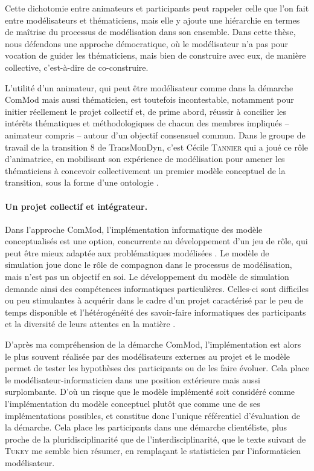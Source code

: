Cette dichotomie entre \og animateurs\fg{} et \og participants\fg{} peut rappeler celle que l'on fait entre \og modélisateurs\fg{} et \og thématiciens\fg{}, mais elle y ajoute une hiérarchie en termes de maîtrise du processus de modélisation dans son ensemble.
Dans cette thèse, nous défendons une approche \og démocratique\fg{}, où le modélisateur n'a pas pour vocation de guider les thématiciens, mais bien de construire avec eux, de manière collective, c'est-à-dire de co-construire.

L'utilité d'un \og animateur\fg{}, qui peut être modélisateur comme dans la démarche ComMod mais aussi thématicien, est toutefois incontestable, notamment pour initier réellement le projet collectif et, de prime abord, réussir à concilier les intérêts thématiques et méthodologiques de chacun des membres impliqués -- animateur compris -- autour d'un objectif consensuel commun.
Dans le groupe de travail de la \og transition 8\fg{} de TransMonDyn, c'est Cécile \textsc{Tannier} qui a joué ce rôle d'animatrice, en mobilisant son expérience de modélisation pour amener les thématiciens à concevoir collectivement un premier modèle conceptuel de la transition, sous la forme d'une ontologie \autocite{tannier_ontologie_2014}.

\paragraph{Un projet collectif et intégrateur.}

Dans l'approche ComMod, l'implémentation informatique des modèle conceptualisés est une option, concurrente au développement d'un jeu de rôle, qui peut être mieux adaptée aux problématiques modélisées \autocite[96-97]{etienne_modelisation_2015}.
Le modèle de simulation joue donc le rôle de compagnon dans le processus de modélisation, mais n'est pas un objectif en soi.
Le développement du modèle de simulation demande ainsi des compétences informatiques particulières.
Celles-ci sont difficiles ou peu stimulantes à acquérir dans le cadre d'un projet caractérisé par le \og peu de temps disponible et l'hétérogénéité des savoir-faire informatiques des participants et la diversité de leurs attentes en la matière\fg{} \autocite[29]{etienne_modelisation_2015}.

D'après ma compréhension de la démarche ComMod, l'implémentation est alors  le plus souvent réalisée par des modélisateurs externes au projet et le modèle permet de tester les hypothèses des participants ou de les faire évoluer.
Cela place le modélisateur-informaticien dans une position extérieure mais aussi surplombante.
D'où un risque que le modèle implémenté soit considéré comme \og l'implémentation\fg{} du modèle conceptuel plutôt que comme une de ses implémentations possibles, et constitue donc l'unique référentiel d'évaluation de la démarche.
Cela place les participants dans une démarche clientéliste, plus proche de la pluridisciplinarité que de l'interdisciplinarité, que le texte suivant de \textsc{Tukey} me semble bien résumer, en remplaçant le \og statisticien\fg{} par l'\og{}informaticien modélisateur\fg{}.

